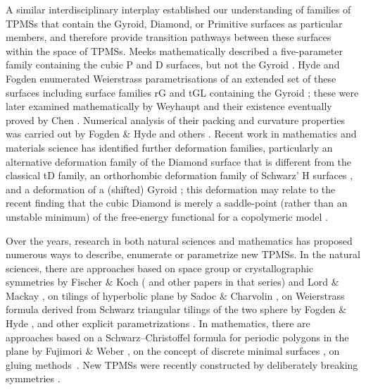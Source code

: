 \documentclass[a4paper]{amsart}
\theoremstyle{plain}
\theoremstyle{definition}
\begin{document}
A similar interdisciplinary interplay established our understanding of families
of TPMSs that contain the Gyroid, Diamond, or Primitive surfaces as particular
members, and therefore provide transition pathways between these surfaces
within the space of TPMSs. Meeks mathematically described a five-parameter
family containing the cubic P and D surfaces, but not the Gyroid
\cite{Meeks1975,meeks1990}. Hyde and Fogden enumerated Weierstrass
parametrisations of an extended set of these surfaces \cite{Fogden_i_1992,
Fogden_ii_1992, Fogden_iii_1993} including surface families rG and tGL
containing the Gyroid \cite{fogden1999}; these were later examined
mathematically by Weyhaupt \cite{weyhaupt2008} and their existence eventually
proved by Chen \cite{Chen_2021}. Numerical analysis of their packing and
curvature properties was carried out by Fogden \& Hyde \cite{fogden1999} and
others \cite{schroderturk2006, SchrderTurk2011,Mickel2012}. Recent work in
mathematics and materials science  has identified further deformation families,
particularly an alternative deformation family of the Diamond surface
\cite{Chen2021a} that is different from the classical tD family, an
orthorhombic deformation family of Schwarz' H surfaces \cite{Chen2021b}, and a
deformation of a (shifted) Gyroid \cite{Wang2024}; this deformation may relate
to the recent finding that the cubic Diamond is merely a saddle-point (rather
than an unstable minimum) of the free-energy functional for a copolymeric model
\cite{DimitriyevGrason2025}.

Over the years, research in both natural sciences and mathematics has proposed
numerous ways to describe, enumerate or parametrize new TPMSs.  In the natural
sciences, there are approaches based on space group or crystallographic
symmetries by Fischer $\&$ Koch (\cite{Koch_1988} and other papers in that
series) and Lord $\&$ Mackay \cite{Lord_2003}, on tilings of hyperbolic plane
by Sadoc $\&$ Charvolin \cite{Sadoc_1989},  on Weierstrass formula derived from
Schwarz triangular tilings of the two sphere by Fogden $\&$ Hyde
\cite{Fogden_i_1992, Fogden_ii_1992}, and other explicit parametrizations
\cite{Gandy_i_2000}.  In mathematics, there are approaches based on a
Schwarz--Christoffel formula for periodic polygons in the plane by Fujimori
$\&$ Weber \cite{Fujimori_2009}, on the concept of discrete minimal surfaces
\cite{Pinkall_1993,Karcher_1996}, on gluing methods~\cite{traizet2008,
chen2022, chen2024}. New TPMSs were recently constructed by deliberately
breaking symmetries \cite{Chen2021a, Chen2021b, Chen_2021}.
\end{document}
